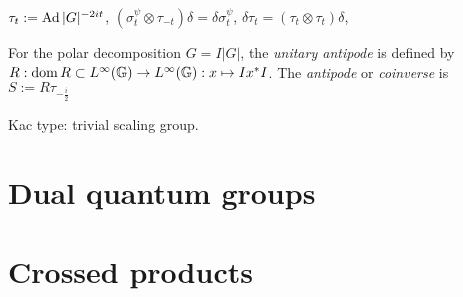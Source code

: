 \documentclass{../../large}
\begin{document}
\begin{prb}[Antipode]
$\tau_t:=\operatorname{Ad}|G|^{-2it}$, $(\sigma_t^\psi\otimes\tau_{-t})\delta=\delta\sigma_t^\psi$, $\delta\tau_t=(\tau_t\otimes\tau_t)\delta$, 

For the polar decomposition $G=I|G|$, the \emph{unitary antipode} is defined by $R:\operatorname{dom} R\subset L^\infty(\mathbb{G})\to L^\infty(\mathbb{G}):x\mapsto Ix^*I$.
The \emph{antipode} or \emph{coinverse} is $S:=R\tau_{-\frac i2}$

\end{prb}


Kac type: trivial scaling group.


\section{Dual quantum groups}

\section{Crossed products}
\end{document}
